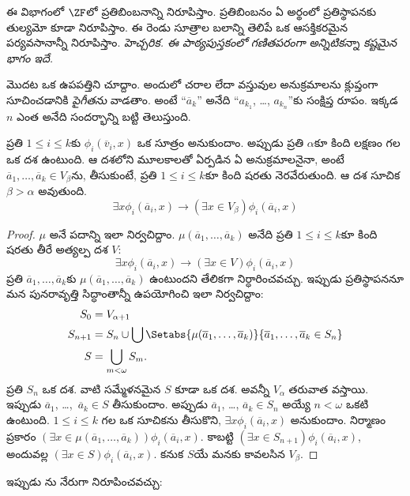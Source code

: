 \documentclass[../../../include/open-logic-section]{subfiles}
\begin{document}

ఈ విభాగంలో $\ZF$లో ప్రతిబింబనాన్ని నిరూపిస్తాం.
ప్రతిబింబనం ఏ అర్థంలో ప్రతిస్థాపనకు తుల్యమో
కూడా నిరూపిస్తాం. ఈ రెండు సూత్రాల బలాన్ని తెలిపే
ఒక ఆసక్తికరమైన పర్యవసానాన్నీ నిరూపిస్తాం.
\emph{హెచ్చరిక. ఈ పాఠ్యపుస్తకంలో గణితపరంగా అన్నిటికన్నా
కష్టమైన భాగం ఇదే.}

మొదట ఒక ఉపపత్తిని చూద్దాం. అందులో చరాల లేదా వస్తువుల
అనుక్రమాలను క్లుప్తంగా సూచించడానికి \emph{పైగీతను} వాడతాం.
అంటే ``$\overline{a}_k$'' అనేది ``$a_{k_1}$, \dots,
$a_{k_n}$''కు సంక్షిప్త రూపం. ఇక్కడ $n$ ఎంత అనేది
సందర్భాన్ని బట్టి తెలుస్తుంది.

\begin{lem}
ప్రతి $1 \leq i \leq k$కు $\phi_i(\overline{v}_i, x)$ ఒక
సూత్రం అనుకుందాం. అప్పుడు ప్రతి $\alpha$కూ కింది లక్షణం గల ఒక దశ ఉంటుంది.
ఆ దశలోని మూలకాలతో ఏర్పడిన ఏ అనుక్రమాలనైనా, అంటే $\overline{a}_1, \ldots, \overline{a}_k \in V_\beta$ను,
తీసుకుంటే, ప్రతి $1 \leq i \leq k$కూ కింది షరతు నెరవేరుతుంది. ఆ దశ సూచిక
$\beta > \alpha$ అవుతుంది.
\[
	\exists x\phi_i(\overline{a}_i, x) \rightarrow (\exists x \in V_\beta) \phi_i(\overline{a}_i, x)
\]
\end{lem}

\begin{proof}
$\mu$ అనే పదాన్ని ఇలా నిర్వచిద్దాం.
$\mu(\overline{a}_1, \ldots, \overline{a}_k)$ అనేది
ప్రతి $1 \leq i \leq k$కూ కింది షరతు తీరే
అత్యల్ప దశ $V$:
\[
\exists x\phi_i(\overline{a}_i, x) \rightarrow (\exists x \in V) \phi_i(\overline{a}_i, x)
\]
ప్రతి $\overline{a}_1, \ldots, \overline{a}_k$కు $\mu(\overline{a}_1, \ldots, \overline{a}_k)$ ఉంటుందని తేలికగా నిర్ధారించవచ్చు. ఇప్పుడు ప్రతిస్థాపననూ మన పునరావృత్తి సిద్ధాంతాన్నీ ఉపయోగించి ఇలా నిర్వచిద్దాం:
\begin{align*}
	S_0 & = V_{\alpha+1}\\
	S_{n+1} & = S_n \cup \bigcup
	\Setabs{\mu(\overline{a}_1, \ldots, \overline{a}_k)}
	{\overline{a}_1, \ldots, \overline{a}_k \in S_n} \\
	S &= \bigcup_{m < \omega} S_m.
\end{align*}
ప్రతి $S_n$ ఒక దశ. వాటి సమ్మేళనమైన $S$ కూడా ఒక దశ. అవన్నీ
$V_\alpha$ తరువాత వస్తాయి. ఇప్పుడు $\overline{a}_1$,
\dots,~$\overline{a}_k \in S$ తీసుకుందాం. అప్పుడు
$\overline{a}_1$, \dots, $\overline{a}_k \in S_n$
అయ్యే $n < \omega$ ఒకటి ఉంటుంది. $1 \leq i \leq k$ గల ఒక సూచికను
తీసుకొని, $\exists x \phi_i(\overline{a}_i,x)$ అనుకుందాం.
నిర్మాణం ప్రకారం $(\exists x \in \mu(\overline{a}_1,
\ldots, \overline{a}_k))\phi_i(\overline{a}_i, x)$.
కాబట్టి $(\exists x \in S_{n+1})\phi_i(\overline{a}_i, x)$,
అందువల్ల $(\exists x \in S)\phi_i(\overline{a}_i, x)$.
కనుక $S$యే మనకు కావలసిన $V_\beta$.
\end{proof}
\noindent
ఇప్పుడు ను నేరుగా నిరూపించవచ్చు:
\end{document}
